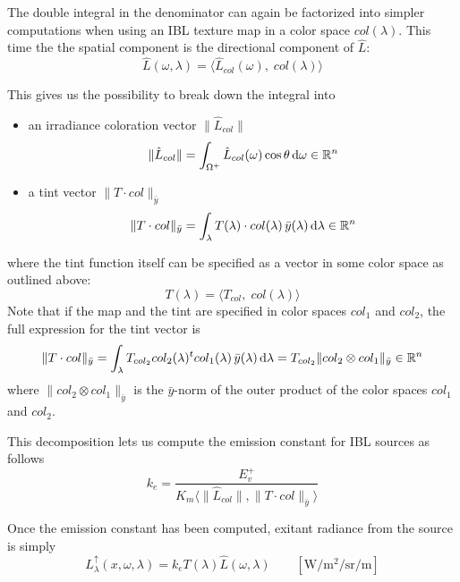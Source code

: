 The double integral in the denominator can again be factorized into simpler
computations when using an \gls{IBL} texture map in a color space $col(\lambda)$.
This time the the spatial component is the directional component of $\hat{L}$:
\begin{equation}
\hat{L}(\omega, \lambda) = \big\langle \hat{L}_{col}(\omega),\; col(\lambda) \big\rangle
\end{equation}

This gives us the possibility to break down the integral into
\begin{itemize}
\item an irradiance coloration vector $\|\hat{L}_{col}\|$
\begin{equation}
\|\hat{L}_{col}\| = \int_{\Omega^+} \hat{L}_{col}(\omega)\cos\theta \mathop{}\!\mathrm{d}\omega \in \mathbb{R}^n
\end{equation}
\item a tint vector $\|T \cdot col\|_{\bar y}$
\begin{equation}
\|T \cdot col\|_{\bar y} = \int_\lambda T(\lambda)\cdot col(\lambda)\,\bar y(\lambda) \mathop{}\!\mathrm{d}\lambda \in \mathbb{R}^n
\end{equation}
\end{itemize}
where the tint function itself can be specified as a vector in some color space
as outlined above:
\begin{equation}
T(\lambda) = \langle T_{col},\; col(\lambda)\rangle
\end{equation}
Note that if the map and the tint are specified in color spaces $col_1$ and
$col_2$, the full expression for the tint vector is
\begin{equation}
\|T \cdot col\|_{\bar y} = \int_\lambda T_{col_2}col_2(\lambda)^t col_1(\lambda)\,\bar y(\lambda) \mathop{}\!\mathrm{d}\lambda
 = T_{col_2} \|col_2 \otimes col_1\|_{\bar y}
 \in \mathbb{R}^n
\end{equation}
where $\|col_2 \otimes col_1\|_{\bar y}$ is the $\bar y$-norm of the outer
product of the color spaces $col_1$ and $col_2$.

This decomposition lets us compute the emission constant for \gls{IBL} sources
as follows
\begin{equation}
k_e = \frac{E^+_v} {K_m \langle \|\hat{L}_{col}\|, \|T \cdot col\|_{\bar y}
\rangle}
\end{equation}

Once the emission constant has been computed, exitant radiance from the source
is simply
\begin{equation}
L^\uparrow_{\lambda}(x, \omega, \lambda) = k_e  T(\lambda)
\hat{L}(\omega,\lambda)
\qquad \left[\si{\watt\per\square\meter\per\steradian\per\meter}\right]
\end{equation}

